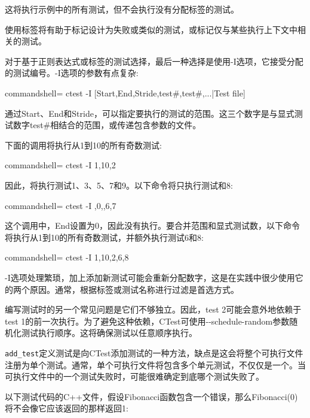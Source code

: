 这将执行示例中的所有测试，但不会执行没有分配标签的测试。

使用标签将有助于标记设计为失败或类似的测试，或标记仅与某些执行上下文中相关的测试。

对于基于正则表达式或标签的测试选择，最后一种选择是使用-I选项，它接受分配的测试编号。-I选项的参数有点复杂:

\begin{tcblisting}{commandshell={}}
ctest -I [Start,End,Stride,test#,test#,...|Test file]
\end{tcblisting}

通过Start、End和Stride，可以指定要执行的测试的范围。这三个数字是与显式测试数字test\#相结合的范围，或传递包含参数的文件。

下面的调用将执行从1到10的所有奇数测试:

\begin{tcblisting}{commandshell={}}
ctest -I 1,10,2
\end{tcblisting}

因此，将执行测试1、3、5、7和9。以下命令将只执行测试和8:

\begin{tcblisting}{commandshell={}}
ctest -I ,0,,6,7
\end{tcblisting}

这个调用中，End设置为0，因此没有执行。要合并范围和显式测试数，以下命令将执行从1到10的所有奇数测试，并额外执行测试6和8:

\begin{tcblisting}{commandshell={}}
ctest -I 1,10,2,6,8
\end{tcblisting}

-I选项处理繁琐，加上添加新测试可能会重新分配数字，这是在实践中很少使用它的两个原因。通常，根据标签或测试名称进行过滤是首选方式。

编写测试时的另一个常见问题是它们不够独立。因此，test 2可能会意外地依赖于test 1的前一次执行。为了避免这种依赖，CTest可使用-{}-schedule-random参数随机化测试执行顺序。这将确保测试以任意顺序执行。


\texttt{add\_test}定义测试是向CTest添加测试的一种方法，缺点是这会将整个可执行文件注册为单个测试。通常，单个可执行文件将包含多个单元测试，不仅仅是一个。当可执行文件中的一个测试失败时，可能很难确定到底哪个测试失败了。

以下测试代码的C++文件，假设Fibonacci函数包含一个错误，那么Fibonacci(0)将不会像它应该返回的那样返回1:

